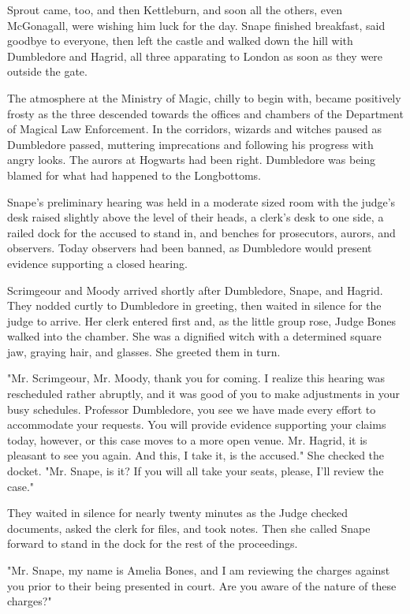Sprout came, too, and then Kettleburn, and soon all the others, even McGonagall, were wishing him luck for the day. Snape finished breakfast, said goodbye to everyone, then left the castle and walked down the hill with Dumbledore and Hagrid, all three apparating to London as soon as they were outside the gate.

The atmosphere at the Ministry of Magic, chilly to begin with, became positively frosty as the three descended towards the offices and chambers of the Department of Magical Law Enforcement. In the corridors, wizards and witches paused as Dumbledore passed, muttering imprecations and following his progress with angry looks. The aurors at Hogwarts had been right. Dumbledore was being blamed for what had happened to the Longbottoms.

Snape's preliminary hearing was held in a moderate sized room with the judge's desk raised slightly above the level of their heads, a clerk's desk to one side, a railed dock for the accused to stand in, and benches for prosecutors, aurors, and observers. Today observers had been banned, as Dumbledore would present evidence supporting a closed hearing.

Scrimgeour and Moody arrived shortly after Dumbledore, Snape, and Hagrid. They nodded curtly to Dumbledore in greeting, then waited in silence for the judge to arrive. Her clerk entered first and, as the little group rose, Judge Bones walked into the chamber. She was a dignified witch with a determined square jaw, graying hair, and glasses. She greeted them in turn.

"Mr. Scrimgeour, Mr. Moody, thank you for coming. I realize this hearing was rescheduled rather abruptly, and it was good of you to make adjustments in your busy schedules. Professor Dumbledore, you see we have made every effort to accommodate your requests. You will provide evidence supporting your claims today, however, or this case moves to a more open venue. Mr. Hagrid, it is pleasant to see you again. And this, I take it, is the accused." She checked the docket. "Mr. {\el}Snape, is it? If you will all take your seats, please, I'll review the case."

They waited in silence for nearly twenty minutes as the Judge checked documents, asked the clerk for files, and took notes. Then she called Snape forward to stand in the dock for the rest of the proceedings.

"Mr. Snape, my name is Amelia Bones, and I am reviewing the charges against you prior to their being presented in court. Are you aware of the nature of these charges?"

